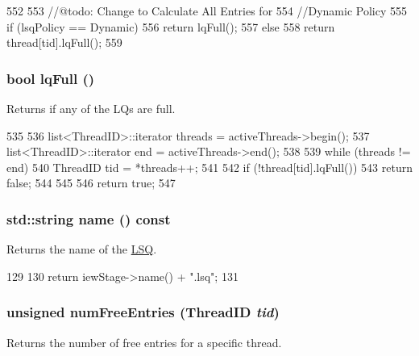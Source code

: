 \begin{DoxyCode}
552 {
553     //@todo: Change to Calculate All Entries for
554     //Dynamic Policy
555     if (lsqPolicy == Dynamic)
556         return lqFull();
557     else
558         return thread[tid].lqFull();
559 }
\end{DoxyCode}
\hypertarget{classLSQ_a5893daf623130be826f492bbff58f757}{
\subsubsection[{lqFull}]{\setlength{\rightskip}{0pt plus 5cm}bool lqFull ()}}
\label{classLSQ_a5893daf623130be826f492bbff58f757}
Returns if any of the LQs are full. 


\begin{DoxyCode}
535 {
536     list<ThreadID>::iterator threads = activeThreads->begin();
537     list<ThreadID>::iterator end = activeThreads->end();
538 
539     while (threads != end) {
540         ThreadID tid = *threads++;
541 
542         if (!thread[tid].lqFull())
543             return false;
544     }
545 
546     return true;
547 }
\end{DoxyCode}
\hypertarget{classLSQ_a37627d5d5bba7f4a8690c71c2ab3cb07}{
\subsubsection[{name}]{\setlength{\rightskip}{0pt plus 5cm}std::string name () const}}
\label{classLSQ_a37627d5d5bba7f4a8690c71c2ab3cb07}
Returns the name of the \hyperlink{classLSQ}{LSQ}. 


\begin{DoxyCode}
129 {
130     return iewStage->name() + ".lsq";
131 }
\end{DoxyCode}
\hypertarget{classLSQ_acc878f608deead5b5319a6a3f98b50c8}{
\subsubsection[{numFreeEntries}]{\setlength{\rightskip}{0pt plus 5cm}unsigned numFreeEntries ({\bf ThreadID} {\em tid})}}
\label{classLSQ_acc878f608deead5b5319a6a3f98b50c8}
Returns the number of free entries for a specific thread. 


